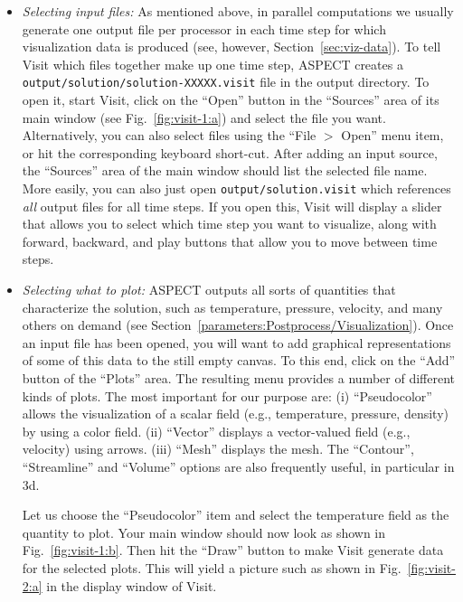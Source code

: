 \documentclass{article}
\newcommand{\aspect}{\textsc{ASPECT}}
\begin{document}
\begin{itemize}
\item \textit{Selecting input files:} As mentioned above, in parallel
  computations we usually generate one output file per processor in each time
  step for which visualization data is produced (see, however,
  Section~\ref{sec:viz-data}). To tell Visit which files together make up one
  time step, \aspect{} creates a \texttt{output/solution/solution-XXXXX.visit}
  file in the output directory. To open it, start Visit, click on the ``Open'' button in
  the ``Sources'' area of
  its main window (see Fig.~\ref{fig:visit-1:a}) and select the file you
  want. Alternatively, you can also select files using the ``File $>$ Open''
  menu item, or hit the corresponding keyboard short-cut. After adding an
  input source, the ``Sources'' area of the main window should list the
  selected file name. More easily, you can also just open
  \texttt{output/solution.visit} which references \textit{all} output files for
  all time steps. If you open this, Visit will display a slider that allows you
  to select which time step you want to visualize, along with forward, backward,
  and play buttons that allow you to move between time steps.

\item \textit{Selecting what to plot:} \aspect{} outputs all sorts of
  quantities that characterize the solution, such as temperature, pressure,
  velocity, and many others on demand (see
  Section~\ref{parameters:Postprocess/Visualization}). Once an input file has
  been opened, you will want to add graphical representations of some of this
  data to the still empty canvas. To this end, click on the ``Add'' button of
  the ``Plots'' area. The resulting menu provides a number of different kinds
  of plots. The most important for our purpose are: (i) ``Pseudocolor'' allows
  the visualization of a scalar field (e.g., temperature, pressure, density)
  by using a color field. (ii) ``Vector'' displays a vector-valued field
  (e.g., velocity) using arrows. (iii) ``Mesh'' displays the mesh. The
  ``Contour'', ``Streamline'' and ``Volume'' options are also frequently
  useful, in particular in 3d.

  Let us choose the ``Pseudocolor'' item and select the temperature field as
  the quantity to plot. Your main window should now look as shown in
  Fig.~\ref{fig:visit-1:b}. Then hit the ``Draw'' button to make Visit generate
  data for the selected plots. This will yield a picture such as shown in
  Fig.~\ref{fig:visit-2:a} in the display window of Visit.


\end{itemize}
\end{document}
